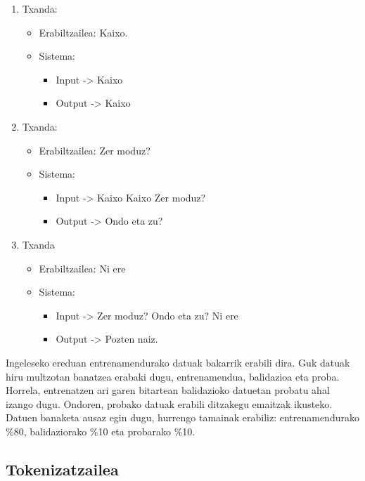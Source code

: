\documentclass[11pt,a4paper]{article}
\begin{document}
\begin{enumerate}
\item Txanda:
    \begin{itemize}
    \item Erabiltzailea: Kaixo.
    \item Sistema:
        \begin{itemize}
        \item Input -> Kaixo
        \item Output -> Kaixo
        \end{itemize}
    \end{itemize}
\item Txanda:
    \begin{itemize}
    \item Erabiltzailea: Zer moduz?
    \item Sistema:
        \begin{itemize}
        \item Input -> Kaixo Kaixo Zer moduz?
        \item Output -> Ondo eta zu?
        \end{itemize}
    \end{itemize}
\item Txanda
    \begin{itemize}
    \item Erabiltzailea: Ni ere
    \item Sistema:
        \begin{itemize}
        \item Input -> Zer moduz? Ondo eta zu? Ni ere
        \item Output -> Pozten naiz.
        \end{itemize}
    \end{itemize}
\end{enumerate}

Ingeleseko ereduan entrenamendurako datuak bakarrik erabili dira. Guk datuak hiru multzotan banatzea erabaki dugu, entrenamendua, balidazioa eta proba. Horrela, entrenatzen ari garen bitartean balidazioko datuetan probatu ahal izango dugu. Ondoren, probako datuak erabili ditzakegu emaitzak ikusteko. Datuen banaketa ausaz egin dugu, hurrengo tamainak erabiliz: entrenamendurako \%80, balidaziorako \%10 eta probarako \%10.

\subsection{Tokenizatzailea}
\end{document}
